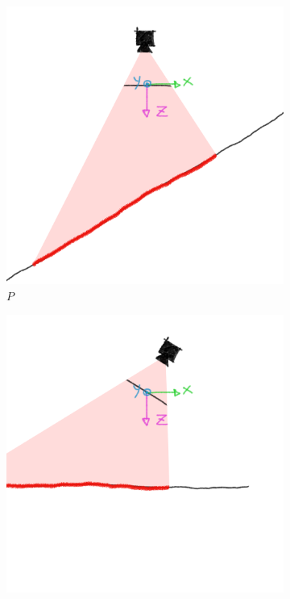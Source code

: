 \begin{figure}[h]
    \centering
    \begin{subfigure}{.32\textwidth}
        \includegraphics[width=\textwidth]{images/P.png}
        \caption{$P$}
    \end{subfigure}
    \hfill
    \begin{subfigure}{.32\textwidth}
        \includegraphics[width=\textwidth]{images/R.png}

\end{subfigure}
\end{figure}
